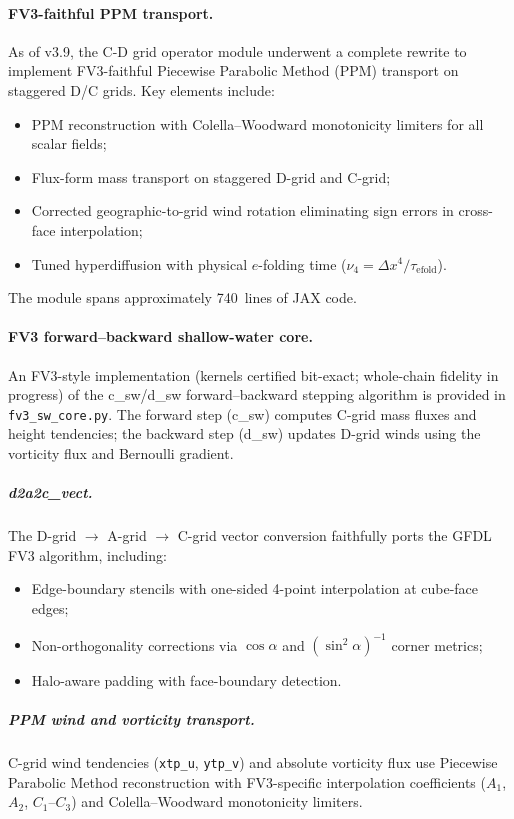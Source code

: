 \documentclass[11pt,twoside]{report}
\begin{document}
\paragraph{FV3-faithful PPM transport.}
As of v3.9, the C-D grid operator module underwent a complete rewrite
to implement FV3-faithful Piecewise Parabolic Method (PPM) transport
\citep{ColellaWoodward1984} on staggered D/C grids.  Key elements include:
\begin{itemize}[nosep]
  \item PPM reconstruction with Colella--Woodward monotonicity limiters
    for all scalar fields;
  \item Flux-form mass transport on staggered D-grid and C-grid;
  \item Corrected geographic-to-grid wind rotation eliminating
    sign errors in cross-face interpolation;
  \item Tuned hyperdiffusion with physical $e$-folding time
    ($\nu_4 = \Delta x^4/\tau_{\mathrm{efold}}$).
\end{itemize}
The module spans approximately 740~lines of JAX code.

\paragraph{FV3 forward--backward shallow-water core.}
An FV3-style implementation (kernels certified bit-exact; whole-chain fidelity in progress) of the c\_sw/d\_sw forward--backward
stepping algorithm is provided in \texttt{fv3\_sw\_core.py}.  The forward
step (c\_sw) computes C-grid mass fluxes and height tendencies; the backward
step (d\_sw) updates D-grid winds using the vorticity flux and Bernoulli
gradient.

\subparagraph{d2a2c\_vect.}
The D-grid $\to$ A-grid $\to$ C-grid vector conversion faithfully ports
the GFDL FV3 algorithm, including:
\begin{itemize}[nosep]
  \item Edge-boundary stencils with one-sided 4-point interpolation at
    cube-face edges;
  \item Non-orthogonality corrections via $\cos\alpha$ and
    $(\sin^2\!\alpha)^{-1}$ corner metrics;
  \item Halo-aware padding with face-boundary detection.
\end{itemize}

\subparagraph{PPM wind and vorticity transport.}
C-grid wind tendencies (\texttt{xtp\_u}, \texttt{ytp\_v}) and absolute
vorticity flux use Piecewise Parabolic Method reconstruction with
FV3-specific interpolation coefficients ($A_1$, $A_2$, $C_1$--$C_3$)
and Colella--Woodward monotonicity limiters.
\end{document}
